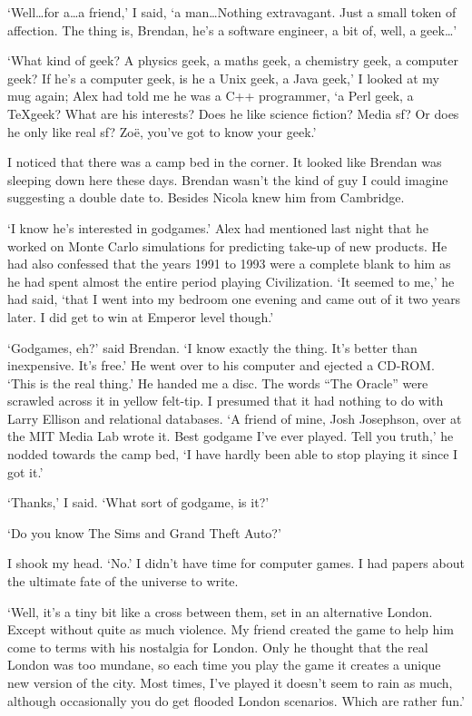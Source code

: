 `Well\dots for a\dots a friend,' I said, `a man\dots Nothing
extravagant. Just a small token of affection. The thing is, Brendan,
he's a software engineer, a bit of, well, a geek\dots'

`What kind of geek? A physics geek, a maths geek, a chemistry geek,
a computer geek? If he's a computer geek, is he a Unix geek, a Java
geek,' I looked at my mug again; Alex had told me he was a C++
programmer, `a Perl geek, a \TeX geek? What are his interests? Does
he like science fiction? Media sf? Or does he only like real sf?
Zoë, you've got to know your geek.'

I noticed that there was a camp bed in the corner. It looked like
Brendan was sleeping down here these days. Brendan wasn't the kind
of guy I could imagine suggesting a double date to. Besides Nicola
knew him from Cambridge.

`I know he's interested in godgames.' Alex had mentioned last night
that he worked on Monte Carlo simulations for predicting take-up of
new products. He had also confessed that the years 1991 to 1993 were
a complete blank to him as he had spent almost the entire period
playing {\twelvesl Civilization\/}. `It seemed to me,' he had said,
`that I went into my bedroom one evening and came out of it two
years later. I did get to win at Emperor level though.'

`Godgames, eh?' said Brendan. `I know exactly the thing. It's better
than inexpensive. It's free.' He went over to his computer and
ejected a CD-ROM. `This is the real thing.' He handed me a disc. The
words ``The Oracle'' were scrawled across it in yellow felt-tip. I
presumed that it had nothing to do with Larry Ellison and relational
databases. `A friend of mine, Josh Josephson, over at the MIT Media
Lab wrote it. Best godgame I've ever played. Tell you truth,' he
nodded towards the camp bed, `I have hardly been able to stop
playing it since I got it.'

`Thanks,' I said. `What sort of godgame, is it?'

`Do you know {\twelvesl The Sims\/} and {\twelvesl Grand Theft
Auto\/}?'

I shook my head. `No.' I didn't have time for computer games. I had
papers about the ultimate fate of the universe to write.

`Well, it's a tiny bit like a cross between them, set in an
alternative London. Except without quite as much violence. My friend
created the game to help him come to terms with his nostalgia for
London. Only he thought that the real London was too mundane, so
each time you play the game it creates a unique new version of
the city. Most times, I've played it doesn't seem to rain as much,
although occasionally you do get flooded London scenarios. Which are
rather fun.'

